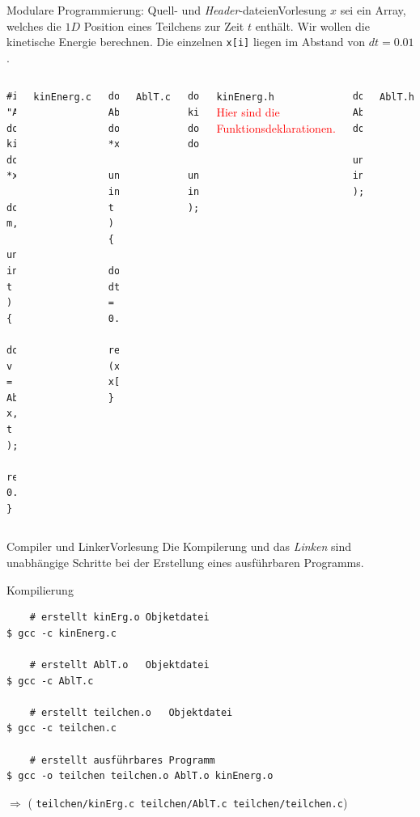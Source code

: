 \documentclass[xcolor=dvipsnames]{beamer}
\newcounter{lecturecounter}
\begin{document}
\begin{frame}[fragile]{Modulare Programmierung: Quell- und \emph{Header}-dateien}{Vorlesung }
\small $x$ sei ein Array, welches die $1D$ Position eines Teilchens zur Zeit $t$ enthält. Wir wollen die kinetische Energie berechnen. Die einzelnen \texttt{x[i]} liegen im Abstand von $dt=0.01$.
\begin{columns}[T]
    \begin{lstlisting}
#include "AblT.h"
double 
kinEnerg( double *x, 
          double m, 
          unsigned int t ) {
  double v = AblT( x, t );
  return 0.5*m*v*v;
}
    \end{lstlisting}
    \texttt{kinEnerg.c}
    \vspace{0.1cm}
    \begin{lstlisting}
double AblT( double *x, 
             unsigned int t ){
  double dt = 0.01;
  return (x[t+1]-x[t])/dt;
}
    \end{lstlisting}
    \texttt{AblT.c}
    \begin{lstlisting}
double kinEnerg( double*, double,
                 unsigned int );
    \end{lstlisting}
    \texttt{kinEnerg.h} \\
    \textcolor{red}{Hier sind die Funktionsdeklarationen.}
    \vspace{2.0cm}
    \begin{lstlisting}
double AblT( double*, 
             unsigned int );
    \end{lstlisting}
    \texttt{AblT.h}  
  \end{columns}
\end{frame}

\begin{frame}[fragile]{Compiler und Linker}{Vorlesung }
  Die Kompilerung und das \emph{Linken} sind unabhängige Schritte bei der Erstellung eines ausführbaren Programms.
\begin{block}{Kompilierung}
  \begin{verbatim}
    # erstellt kinErg.o Objketdatei
$ gcc -c kinEnerg.c

    # erstellt AblT.o   Objektdatei
$ gcc -c AblT.c       

    # erstellt teilchen.o   Objektdatei
$ gcc -c teilchen.c       

    # erstellt ausführbares Programm
$ gcc -o teilchen teilchen.o AblT.o kinEnerg.o 
  \end{verbatim}
\end{block}
$\Rightarrow$ ( \verb|teilchen/kinErg.c teilchen/AblT.c teilchen/teilchen.c|)
\end{frame}
\end{document}
